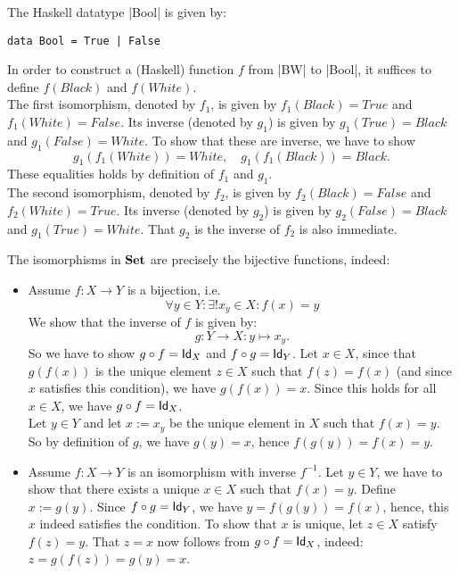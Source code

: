 \begin{solution}\label{sol:iso-bool}
The Haskell datatype |Bool| is given by:
\begin{lstlisting}
data Bool = True | False
\end{lstlisting}
In order to construct a (Haskell) function $f$ from |BW| to |Bool|, it suffices to define $f(Black)$ and $f(White)$.\\
The first isomorphism, denoted by $f_1$, is given by $f_1(Black)=True$ and $f_1(White) = False$. Its inverse (denoted by $g_1$) is given by $g_1(True) = Black$ and $g_1(False) = White$. To show that these are inverse, we have to show 
\[
g_1 (f_1 (White)) = White, \quad g_1 (f_1 (Black)) = Black.
\]
These equalities holds by definition of $f_1$ and $g_1$.\\
The second isomorphism, denoted by $f_2$, is given by $f_2(Black)=False$ and $f_2(White) = True$. Its inverse (denoted by $g_2$) is given by $g_2(False) = Black$ and $g_1(True) = White$. That $g_2$ is the inverse of $f_2$ is also immediate.
\end{solution}

\begin{solution}\label{sol:iso_in_sets}
The isomorphisms in $\SET$ are precisely the bijective functions, indeed:
\begin{itemize}
\item Assume $f: X\to Y$ is a bijection, i.e.
\[
\forall y\in Y: \exists! x_{y}\in X: f(x)=y 
\]
We show that the inverse of $f$ is given by:
\[
g : Y\to X: y\mapsto x_y.
\]
So we have to show $\co{f}{g} = \Id[X]$ and $\co{g}{f} = \Id[Y]$. Let $x\in X$, since that $g(f(x))$ is the unique element $z\in X$ such that $f(z) = f(x)$ (and since $x$ satisfies this condition), we have $g(f(x)) = x$. Since this holds for all $x\in X$, we have $\co{f}{g} = \Id[X]$.\\
Let $y\in Y$ and let $x := x_y$  be the unique element in $X$ such that $f(x)=y$. So by definition of $g$, we have $g(y) = x$, hence 
$f(g(y)) = f(x) = y$.
\item Assume $f:X\to Y$ is an isomorphism with inverse $f^{-1}$. Let $y\in Y$, we have to show that there exists a unique $x\in X$ such that $f(x)=y$. Define $x := g(y)$. Since $\co{g}{f} = \Id[Y]$, we have $y = f(g(y)) = f(x)$, hence, this $x$ indeed satisfies the condition. To show that $x$ is unique, let $z\in X$ satisfy $f(z)=y$. That $z=x$ now follows from $\co{f}{g} = \Id[X]$, indeed: 
$z = g(f(z)) = g(y) = x$.
\end{itemize}
\end{solution}

